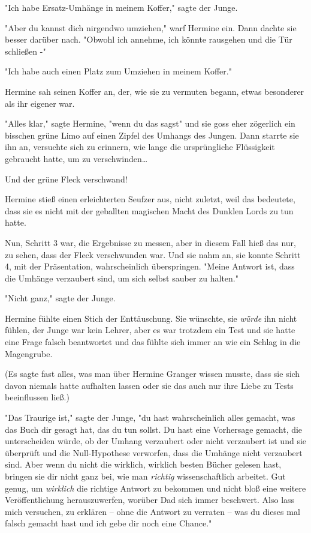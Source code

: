 {"Ich habe Ersatz-Umhänge in meinem Koffer," sagte der Junge.

"Aber du kannst dich nirgendwo umziehen," warf Hermine ein. Dann dachte sie besser darüber nach. "Obwohl ich annehme, ich könnte rausgehen und die Tür schließen -"

"Ich habe auch einen Platz zum Umziehen in meinem Koffer."

Hermine sah seinen Koffer an, der, wie sie zu vermuten begann, etwas besonderer als ihr eigener war.

"Alles klar," sagte Hermine, "wenn du das sagst" und sie goss eher zögerlich ein bisschen grüne Limo auf einen Zipfel des Umhangs des Jungen. Dann starrte sie ihn an, versuchte sich zu erinnern, wie lange die ursprüngliche Flüssigkeit gebraucht hatte, um zu verschwinden…

Und der grüne Fleck verschwand!

Hermine stieß einen erleichterten Seufzer aus, nicht zuletzt, weil das bedeutete, dass sie es nicht mit der geballten magischen Macht des Dunklen Lords zu tun hatte.

Nun, Schritt 3 war, die Ergebnisse zu messen, aber in diesem Fall hieß das nur, zu sehen, dass der Fleck verschwunden war. Und sie nahm an, sie konnte Schritt 4, mit der Präsentation, wahrscheinlich überspringen. "Meine Antwort ist, dass die Umhänge verzaubert sind, um sich selbst sauber zu halten."

"Nicht ganz," sagte der Junge.

Hermine fühlte einen Stich der Enttäuschung. Sie wünschte, sie \emph{würde} ihn nicht fühlen, der Junge war kein Lehrer, aber es war trotzdem ein Test und sie hatte eine Frage falsch beantwortet und das fühlte sich immer an wie ein Schlag in die Magengrube.

(Es sagte fast alles, was man über Hermine Granger wissen musste, dass sie sich davon niemals hatte aufhalten lassen oder sie das auch nur ihre Liebe zu Tests beeinflussen ließ.)

"Das Traurige ist," sagte der Junge, "du hast wahrscheinlich alles gemacht, was das Buch dir gesagt hat, das du tun sollst. Du hast eine Vorhersage gemacht, die unterscheiden würde, ob der Umhang verzaubert oder nicht verzaubert ist und sie überprüft und die Null-Hypothese verworfen, dass die Umhänge nicht verzaubert sind. Aber wenn du nicht die wirklich, wirklich besten Bücher gelesen hast, bringen sie dir nicht ganz bei, wie man \emph{richtig} wissenschaftlich arbeitet. Gut genug, um \emph{wirklich} die richtige Antwort zu bekommen und nicht bloß eine weitere Veröffentlichung herauszuwerfen, worüber Dad sich immer beschwert. Also lass mich versuchen, zu erklären -- ohne die Antwort zu verraten -- was du dieses mal falsch gemacht hast und ich gebe dir noch eine Chance."

}
